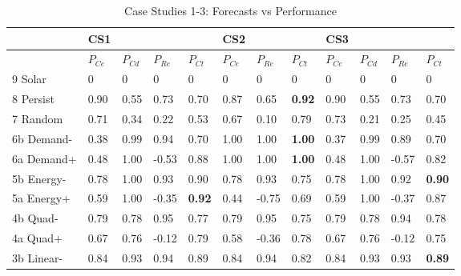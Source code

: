 \documentclass[conference]{IEEEtran}
\begin{document}
\begin{table}%
    \centering
    \caption{Case Studies 1-3: Forecasts vs Performance}
    \label{tab:performance}
    \setlength{\tabcolsep}{1pt}
    \begin{tabular}{l|l l l l|l l l| l l l l}
        \hline
        ~            & CS1      &          &          &               & CS2      &          &               & CS3      &          &          &          \\ \hline 
        ~            & $P_{Ce}$ & $P_{Cd}$ & $P_{Re}$ & $P_{Ct}$      & $P_{Ce}$ & $P_{Re}$ & $P_{Ct}$      & $P_{Ce}$ & $P_{Cd}$ & $P_{Re}$ & $P_{Ct}$ \\ \hline \hline 
        9 Solar      & 0        & 0        & 0        & 0             & 0        & 0        & 0             & 0        & 0        & 0        & 0        \\ \hline  
        8 Persist    & 0.90     & 0.55     & 0.73     & 0.70          & 0.87     & 0.65     & \textbf{0.92} & 0.90     & 0.55     & 0.73     & 0.70     \\ \hline
        7 Random     & 0.71     & 0.34     & 0.22     & 0.53          & 0.67     & 0.10     & 0.79          & 0.73     & 0.21     & 0.25     & 0.45     \\ \hline
        6b Demand-   & 0.38     & 0.99     & 0.94     & 0.70          & 1.00     & 1.00     & \textbf{1.00} & 0.37     & 0.99     & 0.89     & 0.70     \\ \hline
        6a Demand+   & 0.48     & 1.00     & -0.53    & 0.88          & 1.00     & 1.00     & \textbf{1.00} & 0.48     & 1.00     & -0.57    & 0.82     \\ \hline
        5b Energy-   & 0.78     & 1.00     & 0.93     & 0.90          & 0.78     & 0.93     & 0.75          & 0.78     & 1.00     & 0.92     & \textbf{0.90}     \\ \hline
        5a Energy+   & 0.59     & 1.00     & -0.35    & \textbf{0.92} & 0.44     & -0.75    & 0.69          & 0.59     & 1.00     & -0.37    & 0.87     \\ \hline
        4b Quad-     & 0.79     & 0.78     & 0.95     & 0.77          & 0.79     & 0.95     & 0.75          & 0.79     & 0.78     & 0.94     & 0.78     \\ \hline
        4a Quad+     & 0.67     & 0.76     & -0.12    & 0.79          & 0.58     & -0.36    & 0.78          & 0.67     & 0.76     & -0.12    & 0.75     \\ \hline
        3b Linear-   & 0.84     & 0.93     & 0.94     & 0.89          & 0.84     & 0.94     & 0.82          & 0.84     & 0.93     & 0.93     & \textbf{0.89}     \\ \hline

\end{tabular}
\end{table}
\end{document}
